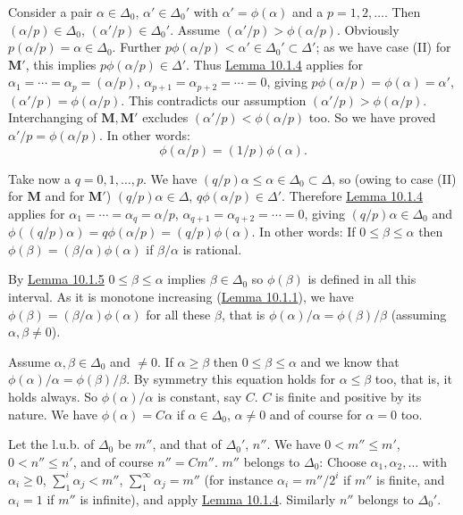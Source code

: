 \documentclass[12pt,b5paper,twoside]{article}
\newcommand{\M}{\mathbf M}
\newcommand{\lemref}[1]{\hyperref[lem:#1]{Lemma #1}}
\begin{document}
Consider a pair $\alpha\in\Delta_0$, $\alpha'\in\Delta_0'$ with
$\alpha'=\phi(\alpha)$ and a $p=1,2,\ldots$. Then
$(\alpha/p)\in\Delta_0$, $(\alpha'/p)\in\Delta_0'$. Assume
$(\alpha'/p)>\phi(\alpha/p)$. Obviously
$p(\alpha/p)=\alpha\in\Delta_0$. Further
$p\phi(\alpha/p)<\alpha'\in\Delta_0'\subset\Delta'$; as we have case (II)
for $\M'$, this implies $p\phi(\alpha/p)\in\Delta'$. Thus
\lemref{10.1.4} applies for
$\alpha_1=\cdots=\alpha_p=(\alpha/p)$,
$\alpha_{p+1}=\alpha_{p+2}=\cdots=0$, giving
$p\phi(\alpha/p)=\phi(\alpha)=\alpha'$, $(\alpha'/p)=\phi(\alpha/p)$.
This contradicts our assumption $(\alpha'/p)>\phi(\alpha/p)$.
Interchanging of $\M,\M'$ excludes
$(\alpha'/p)<\phi(\alpha/p)$ too. So we have proved
$\alpha'/p=\phi(\alpha/p)$. In other words:
\[
 \phi(\alpha/p)=(1/p)\phi(\alpha).
\]

Take now a $q=0,1,\ldots,p$. We have
$(q/p)\alpha\leq\alpha\in\Delta_0\subset\Delta$, so (owing to case (II)
for $\M$ and for $\M'$) $(q/p)\alpha\in\Delta$,
$q\phi(\alpha/p)\in\Delta'$. Therefore \lemref{10.1.4} applies for
$\alpha_1=\cdots=\alpha_q=\alpha/p$,
$\alpha_{q+1}=\alpha_{q+2}=\cdots=0$, giving
$(q/p)\alpha\in\Delta_0$ and
$\phi((q/p)\alpha)=q\phi(\alpha/p)=(q/p)\phi(\alpha)$. In other words: If
$0\leq\beta\leq\alpha$ then
$\phi(\beta)=(\beta/\alpha)\phi(\alpha)$ if $\beta/\alpha$ is rational.

By \lemref{10.1.5} $0\leq\beta\leq\alpha$ implies
$\beta\in\Delta_0$ so $\phi(\beta)$ is defined in all this interval. As it
is monotone increasing (\lemref{10.1.1}), we have
$\phi(\beta)=(\beta/\alpha)\phi(\alpha)$ for all these $\beta$, that is
$\phi(\alpha)/\alpha=\phi(\beta)/\beta$ (assuming
$\alpha,\beta\ne0$).

Assume $\alpha,\beta\in\Delta_0$ and $\ne0$. If $\alpha\geq\beta$ then
$0\leq\beta\leq\alpha$ and we know that
$\phi(\alpha)/\alpha=\phi(\beta)/\beta$. By symmetry this equation holds
for $\alpha\leq\beta$ too, that is, it holds always. So
$\phi(\alpha)/\alpha$ is constant, say $C$. $C$ is finite and positive by
its nature. We have $\phi(\alpha)=C\alpha$ if
$\alpha\in\Delta_0$, $\alpha\ne0$ and of course for $\alpha=0$ too.

Let the l.u.b. of $\Delta_0$ be $m''$, and that of $\Delta_0'$, $n''$. We
have $0<m''\leq m'$, $0<n''\leq n'$, and of course $n''=Cm''$.
$m''$ belongs to $\Delta_0$: Choose $\alpha_1,\alpha_2,\ldots$ with
$\alpha_i\geq0$, $\sum_1^i\alpha_j<m''$,
$\sum_{1}^{\infty}\alpha_j=m''$ (for instance
$\alpha_i=m''/2^i$ if $m''$ is finite, and $\alpha_i=1$ if $m''$ is
infinite), and apply \lemref{10.1.4}. Similarly $n''$ belongs to
$\Delta_0'$.
\end{document}
